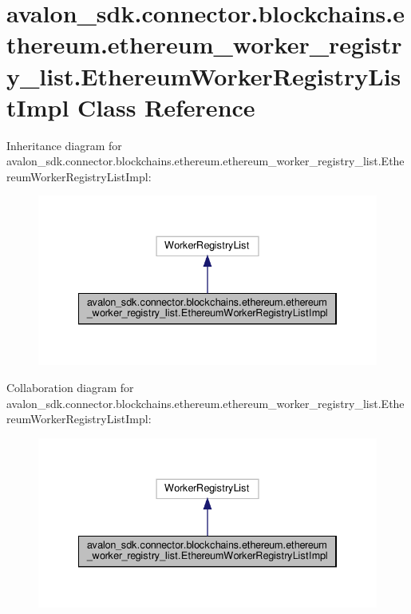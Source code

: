 \hypertarget{classavalon__sdk_1_1connector_1_1blockchains_1_1ethereum_1_1ethereum__worker__registry__list_1_1EthereumWorkerRegistryListImpl}{}\section{avalon\+\_\+sdk.\+connector.\+blockchains.\+ethereum.\+ethereum\+\_\+worker\+\_\+registry\+\_\+list.\+Ethereum\+Worker\+Registry\+List\+Impl Class Reference}
\label{classavalon__sdk_1_1connector_1_1blockchains_1_1ethereum_1_1ethereum__worker__registry__list_1_1EthereumWorkerRegistryListImpl}


Inheritance diagram for avalon\+\_\+sdk.\+connector.\+blockchains.\+ethereum.\+ethereum\+\_\+worker\+\_\+registry\+\_\+list.\+Ethereum\+Worker\+Registry\+List\+Impl\+:
\nopagebreak
\begin{figure}[H]
\begin{center}
\leavevmode
\includegraphics[width=334pt]{classavalon__sdk_1_1connector_1_1blockchains_1_1ethereum_1_1ethereum__worker__registry__list_1_1106ecb23a5955c7ee6e628bab558ef3b}
\end{center}
\end{figure}


Collaboration diagram for avalon\+\_\+sdk.\+connector.\+blockchains.\+ethereum.\+ethereum\+\_\+worker\+\_\+registry\+\_\+list.\+Ethereum\+Worker\+Registry\+List\+Impl\+:
\nopagebreak
\begin{figure}[H]
\begin{center}
\leavevmode
\includegraphics[width=334pt]{classavalon__sdk_1_1connector_1_1blockchains_1_1ethereum_1_1ethereum__worker__registry__list_1_10dbb245b1118a8f10b8eaa1a80703bb4}
\end{center}
\end{figure}
